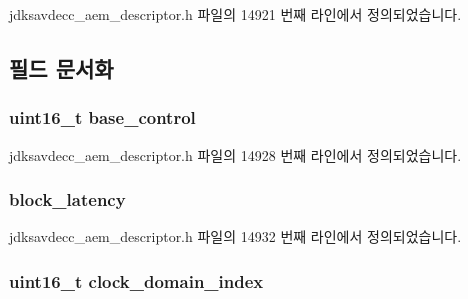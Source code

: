 jdksavdecc\+\_\+aem\+\_\+descriptor.\+h 파일의 14921 번째 라인에서 정의되었습니다.



\subsection{필드 문서화}
\subsubsection[{\texorpdfstring{base\+\_\+control}{base_control}}]{\setlength{\rightskip}{0pt plus 5cm}uint16\+\_\+t base\+\_\+control}\hypertarget{structjdksavdecc__descriptor__external__port_af06eac7dd98377a85258308e8a25e7f2}{}\label{structjdksavdecc__descriptor__external__port_af06eac7dd98377a85258308e8a25e7f2}


jdksavdecc\+\_\+aem\+\_\+descriptor.\+h 파일의 14928 번째 라인에서 정의되었습니다.

\subsubsection[{\texorpdfstring{block\+\_\+latency}{block_latency}}]{ block\+\_\+latency}\hypertarget{structjdksavdecc__descriptor__external__port_ae2e9f0088d5e900b610d1b2818dfc559}{}\label{structjdksavdecc__descriptor__external__port_ae2e9f0088d5e900b610d1b2818dfc559}


jdksavdecc\+\_\+aem\+\_\+descriptor.\+h 파일의 14932 번째 라인에서 정의되었습니다.

\subsubsection[{\texorpdfstring{clock\+\_\+domain\+\_\+index}{clock_domain_index}}]{\setlength{\rightskip}{0pt plus 5cm}uint16\+\_\+t clock\+\_\+domain\+\_\+index}\hypertarget{structjdksavdecc__descriptor__external__port_a6608f023d147b556a49527d568abed8e}{}\label{structjdksavdecc__descriptor__external__port_a6608f023d147b556a49527d568abed8e}


